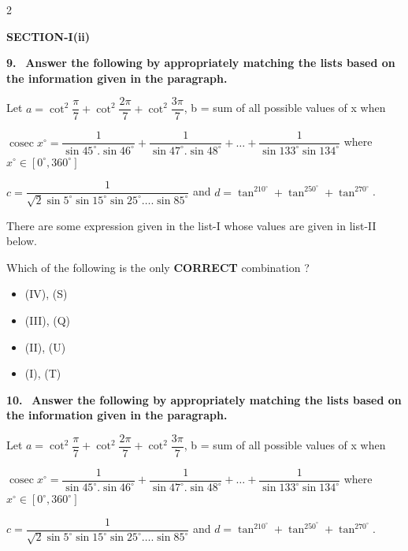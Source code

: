\documentclass[10pt]{extarticle}
\newcommand{\sect}[1]{\par\smallskip\noindent\textbf{#1}\par}
\newcommand{\qn}[1]{\par\smallskip\noindent\textbf{#1.}~}
\newenvironment{qoptions}{\begin{itemize}[leftmargin=1.8em,itemsep=1pt,topsep=2pt,label={}]}{\end{itemize}}
\newcommand{\opt}[2]{\item[(#1)] #2}
\begin{document}
\begin{multicols}{2}
\begin{qoptions}
\end{qoptions}
\sect{SECTION-I(ii)}
\qn{9} \textbf{Answer the following by appropriately matching the lists based on the information given in the paragraph.}\par
Let $a=\cot^2\dfrac\pi7+\cot^2\dfrac{2\pi}7+\cot^2\dfrac{3\pi}7$, b = sum of all possible values of x when\par
$\operatorname{cosec}x^\circ=\dfrac{1}{\sin45^\circ.\sin46^\circ}+\dfrac{1}{\sin47^\circ.\sin48^\circ}+\ldots+\dfrac{1}{\sin133^\circ\sin134^\circ}$ where $x^\circ\in[0^\circ,360^\circ]$\par
$c=\dfrac{1}{\sqrt2\sin5^\circ\sin15^\circ\sin25^\circ\ldots.\sin85^\circ}$ and $d=\tan^210^\circ+\tan^250^\circ+\tan^270^\circ$.\par
There are some expression given in the list-I whose values are given in list-II below.\par
\smallskip
{}\par
Which of the following is the only \textbf{CORRECT} combination ?
\begin{qoptions}
\opt{A}{(IV), (S)}
\opt{B}{(III), (Q)}
\opt{C}{(II), (U)}
\opt{D}{(I), (T)}
\end{qoptions}
\qn{10} \textbf{Answer the following by appropriately matching the lists based on the information given in the paragraph.}\par
Let $a=\cot^2\dfrac\pi7+\cot^2\dfrac{2\pi}7+\cot^2\dfrac{3\pi}7$, b = sum of all possible values of x when\par
$\operatorname{cosec}x^\circ=\dfrac{1}{\sin45^\circ.\sin46^\circ}+\dfrac{1}{\sin47^\circ.\sin48^\circ}+\ldots+\dfrac{1}{\sin133^\circ\sin134^\circ}$ where $x^\circ\in[0^\circ,360^\circ]$\par
$c=\dfrac{1}{\sqrt2\sin5^\circ\sin15^\circ\sin25^\circ\ldots.\sin85^\circ}$ and $d=\tan^210^\circ+\tan^250^\circ+\tan^270^\circ$.\par

\end{multicols}
\end{document}
